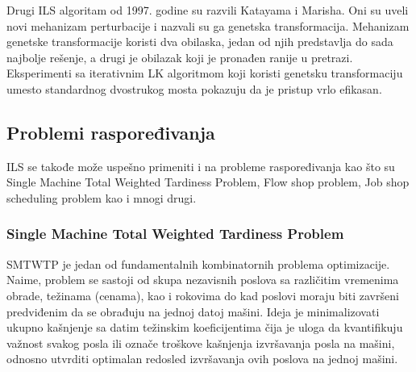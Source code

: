 \documentclass[a4paper]{article}
\begin{document}
Drugi ILS algoritam od 1997. godine su razvili Katayama i Marisha. Oni su uveli novi mehanizam perturbacije i nazvali su ga genetska transformacija. Mehanizam genetske transformacije koristi dva obilaska, jedan od njih predstavlja do sada najbolje rešenje, a drugi je obilazak koji je pronađen ranije u pretrazi. Eksperimenti sa iterativnim LK algoritmom koji koristi genetsku transformaciju umesto standardnog dvostrukog mosta pokazuju da je pristup vrlo efikasan.





\subsection{Problemi raspoređivanja}
ILS se takođe može uspešno primeniti i na probleme raspoređivanja kao što su Single Machine Total Weighted Tardiness Problem, Flow shop problem, Job shop scheduling problem
kao i mnogi drugi.
\subsubsection{Single Machine Total Weighted Tardiness Problem}
SMTWTP je jedan od fundamentalnih kombinatornih problema optimizacije. Naime, problem se sastoji od skupa nezavisnih poslova sa različitim vremenima obrade, težinama (cenama), kao i rokovima do kad poslovi moraju biti završeni predviđenim da se obrađuju na jednoj datoj mašini. Ideja je minimalizovati ukupno kašnjenje sa datim težinskim koeficijentima čija je uloga da kvantifikuju važnost svakog posla ili označe troškove kašnjenja izvršavanja posla na mašini, odnosno utvrditi optimalan redosled izvršavanja ovih poslova na jednoj mašini.
\end{document}
